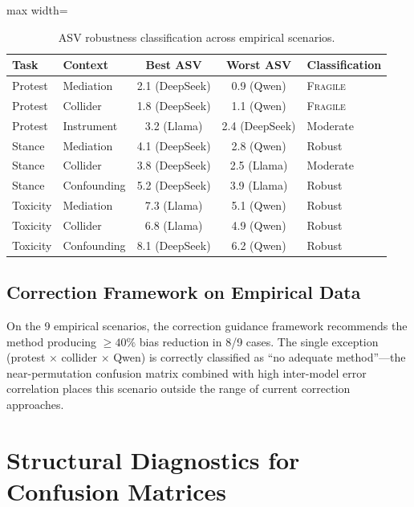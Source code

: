 \documentclass[11pt]{article}
\begin{document}
\begin{table}[t]
\centering
\caption{ASV robustness classification across empirical scenarios.}
\label{tab:asv-robustness}
\small
\begin{adjustbox}{max width=\textwidth}
\begin{tabular}{llccl}
\toprule
Task & Context & Best ASV & Worst ASV & Classification \\
\midrule
Protest  & Mediation   & 2.1 (DeepSeek) & 0.9 (Qwen) & \textsc{Fragile} \\
Protest  & Collider    & 1.8 (DeepSeek) & 1.1 (Qwen) & \textsc{Fragile} \\
Protest  & Instrument  & 3.2 (Llama)    & 2.4 (DeepSeek) & Moderate \\
Stance   & Mediation   & 4.1 (DeepSeek) & 2.8 (Qwen) & Robust \\
Stance   & Collider    & 3.8 (DeepSeek) & 2.5 (Llama) & Moderate \\
Stance   & Confounding & 5.2 (DeepSeek) & 3.9 (Llama) & Robust \\
Toxicity & Mediation   & 7.3 (Llama)    & 5.1 (Qwen) & Robust \\
Toxicity & Collider    & 6.8 (Llama)    & 4.9 (Qwen) & Robust \\
Toxicity & Confounding & 8.1 (DeepSeek) & 6.2 (Qwen) & Robust \\
\bottomrule
\end{tabular}
\end{adjustbox}
\end{table}


\subsection{Correction Framework on Empirical Data}

On the 9 empirical scenarios, the correction guidance framework recommends the method producing $\ge\!40\%$ bias reduction in 8/9 cases.
The single exception (protest $\times$ collider $\times$ Qwen) is correctly classified as ``no adequate method''---the near-permutation confusion matrix combined with high inter-model error correlation places this scenario outside the range of current correction approaches.


\section{Structural Diagnostics for Confusion Matrices}
\label{sec:diagnostics}
\end{document}
